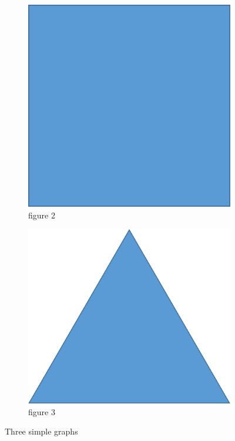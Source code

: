 \begin{figure}
\begin{subfigure}[]{0.3\textwidth}
         \includegraphics[width=\textwidth]{img/fig2.png}
         \caption{figure 2}
         \label{fig:22222}
     \end{subfigure}
     \hfill
     \begin{subfigure}[]{0.3\textwidth}
         \centering
         \includegraphics[width=\textwidth]{img/fig3.png}
         \caption{figure 3}
         \label{fig:33333}
     \end{subfigure}
        \caption{Three simple graphs}
        \label{fig:three graphs}
\end{figure}